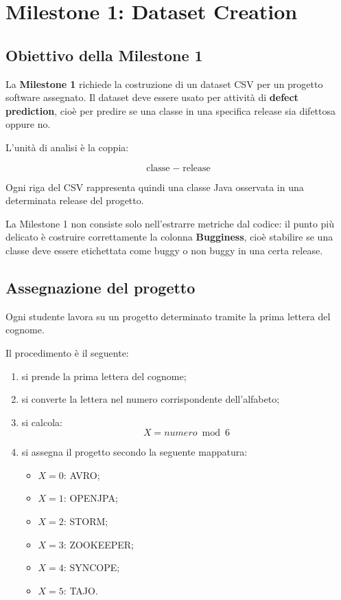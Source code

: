 \chapter{Milestone 1: Dataset Creation}

\section{Obiettivo della Milestone 1}

La \textbf{Milestone 1} richiede la costruzione di un dataset CSV per un progetto software assegnato. Il dataset deve essere usato per attività di \textbf{defect prediction}, cioè per predire se una classe in una specifica release sia difettosa oppure no.

L'unità di analisi è la coppia:

\[
    \text{classe} \;-\; \text{release}
\]

Ogni riga del CSV rappresenta quindi una classe Java osservata in una determinata release del progetto.

\begin{notaesame}
La Milestone 1 non consiste solo nell'estrarre metriche dal codice: il punto più delicato è costruire correttamente la colonna \textbf{Bugginess}, cioè stabilire se una classe deve essere etichettata come buggy o non buggy in una certa release.
\end{notaesame}

\section{Assegnazione del progetto}

Ogni studente lavora su un progetto determinato tramite la prima lettera del cognome.

Il procedimento è il seguente:

\begin{enumerate}
    \item si prende la prima lettera del cognome;
    \item si converte la lettera nel numero corrispondente dell'alfabeto;
    \item si calcola:
    \[
        X = numero \bmod 6
    \]
    \item si assegna il progetto secondo la seguente mappatura:
    \begin{itemize}
        \item \(X = 0\): AVRO;
        \item \(X = 1\): OPENJPA;
        \item \(X = 2\): STORM;
        \item \(X = 3\): ZOOKEEPER;
        \item \(X = 4\): SYNCOPE;
        \item \(X = 5\): TAJO.
    \end{itemize}
\end{enumerate}

